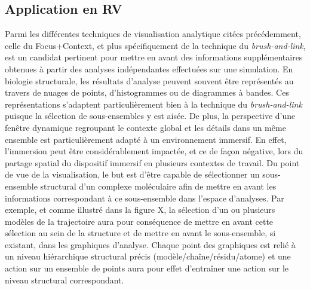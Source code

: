 
\subsection{Application en RV}

Parmi les différentes techniques de visualisation analytique citées précédemment, celle du Focus+Context, et plus spécifiquement de la technique du \textit{brush-and-link}, est un candidat pertinent pour mettre en avant des informations supplémentaires obtenues à partir des analyses indépendantes effectuées sur une simulation. En biologie structurale, les résultats d'analyse peuvent souvent être représentés au travers de nuages de points, d'histogrammes ou de diagrammes à bandes. Ces représentations s'adaptent particulièrement bien à la technique du \textit{brush-and-link} puisque la sélection de sous-ensembles y est aisée. De plus, la perspective d'une fenêtre dynamique regroupant le contexte global et les détails dans un même ensemble est particulièrement adapté à un environnement immersif. En effet, l'immersion peut être considérablement impactée, et ce de façon négative, lors du partage spatial du dispositif immersif en plusieurs contextes de travail.
Du point de vue de la visualisation, le but est d'être capable de sélectionner un sous-ensemble structural d'un complexe moléculaire afin de mettre en avant les informations correspondant à ce sous-ensemble dans l'espace d'analyses. Par exemple, et comme illustré dans la figure X, la sélection d'un ou plusieurs modèles de la trajectoire aura pour conséquence de mettre en avant cette sélection au sein de la structure et de mettre en avant le sous-ensemble, si existant, dans les graphiques d'analyse. Chaque point des graphiques est relié à un niveau hiérarchique structural précis (modèle/chaîne/résidu/atome) et une action sur un ensemble de points aura pour effet d’entraîner une action sur le niveau structural correspondant. 
